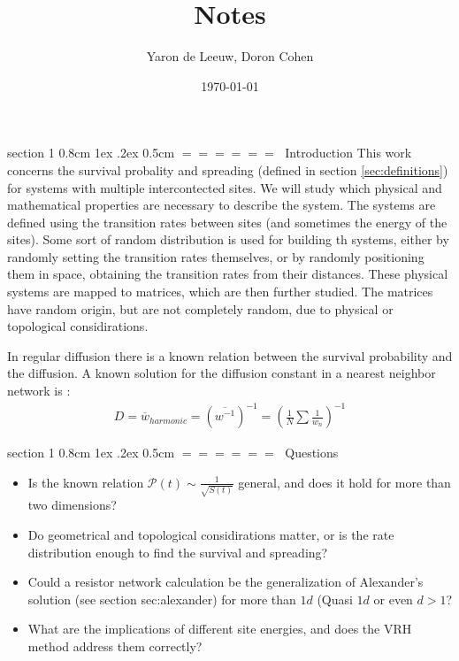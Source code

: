 \documentclass[onecolumn,fleqn,notitlepage,secnumarabic]{revtex4}
\makeatletter
\def\section{%
  \@startsection
    {section}%
    {1}%
    {\z@}%
    {0.8cm \@plus1ex \@minus .2ex}%
    {0.5cm}%
    {\Large\bf $=\!=\!=\!=\!=\!=\;$}%
}%
\makeatother
\begin{document}
\title{Notes}

\author{Yaron de Leeuw, Doron Cohen}
\date{\today}
\maketitle



\section{Introduction}
This work concerns the survival probality and spreading (defined in section \ref{sec:definitions}) for systems with multiple intercontected sites. We will study which physical and mathematical properties are necessary to describe the system. The systems are defined using the transition rates between sites (and sometimes the energy of the sites). Some sort of random distribution is used for building th systems, either by randomly setting the transition rates themselves, or by randomly positioning them in space, obtaining the transition rates from their distances. These physical systems are mapped to matrices, which are then further studied. The matrices have random origin, but are not completely random, due to physical or topological considirations.


In regular diffusion there is a known relation between the survival probability and the diffusion. 
A known solution for the diffusion constant in a nearest neighbor network is \cite{Derrida:1983}:
\begin{align}
D=\overline{w}_{harmonic} =(\overline{w^{-1}})^{-1}=\left(\frac{1}{N}\sum\frac{1}{w_n}\right)^{-1}
\end{align}

\section{Questions}
\begin{itemize}
    \item Is the known relation $\mathcal{P}(t) \sim \frac{1}{\sqrt{S(t)}}$ general, and does it hold for more than two dimensions?
    \item Do geometrical and topological considirations matter, or is the rate distribution enough to find the survival and spreading?
    \item Could a resistor network calculation be the generalization of Alexander's solution (see section {sec:alexander}) for more than $1d$ (Quasi $1d$ or even $d>1$?
    \item What are the implications of different site energies, and does the VRH method address them correctly?
\end{itemize}
\end{document}
